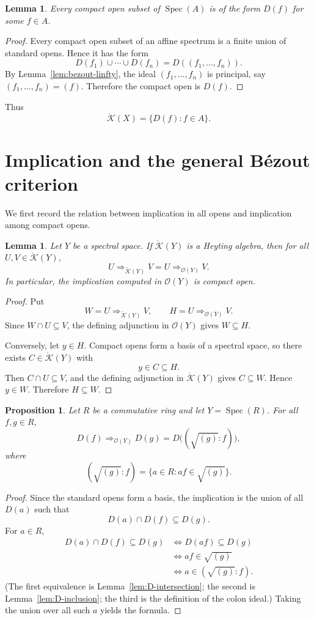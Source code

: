 \documentclass{amsart}
\newtheorem{proposition}[theorem]{Proposition}
\newtheorem{lemma}[theorem]{Lemma}
\theoremstyle{definition}
\theoremstyle{remark}
\newcommand{\Spec}[1]{\operatorname{Spec}\left(#1\right)}
\newcommand{\Op}[1]{\mathcal{O}\left(#1\right)}
\newcommand{\KOp}[1]{\mathring{\mathcal{K}}\left(#1\right)}
\begin{document}
\begin{lemma}\label{lem:compact-opens-principal}
Every compact open subset of $\Spec{A}$ is of the form $D(f)$ for some
$f\in A$.
\end{lemma}

\begin{proof}
Every compact open subset of an affine spectrum is a finite union of standard
opens. Hence it has the form
\[
D(f_1)\cup\cdots\cup D(f_n)=D((f_1,\dots,f_n)).
\]
By Lemma~\ref{lem:bezout-linfty}, the ideal $(f_1,\dots,f_n)$ is principal,
say $(f_1,\dots,f_n)=(f)$. Therefore the compact open is $D(f)$.
\end{proof}

Thus
\[
\KOp{X}=\{D(f):f\in A\}.
\]

\section{Implication and the general B\'ezout criterion}

We first record the relation between implication in all opens and implication
among compact opens.

\begin{lemma}\label{lem:implications-coincide}
Let $Y$ be a spectral space. If $\KOp{Y}$ is a Heyting algebra, then for all
$U,V\in\KOp{Y}$,
\[
U\Rightarrow_{\KOp{Y}}V
=
U\Rightarrow_{\Op{Y}}V.
\]
In particular, the implication computed in $\Op{Y}$ is compact open.
\end{lemma}

\begin{proof}
Put
\[
W=U\Rightarrow_{\KOp{Y}}V,
\qquad
H=U\Rightarrow_{\Op{Y}}V.
\]
Since $W\cap U\subseteq V$, the defining adjunction in $\Op{Y}$ gives
$W\subseteq H$.

Conversely, let $y\in H$. Compact opens form a basis of a spectral space, so
there exists $C\in\KOp{Y}$ with
\[
y\in C\subseteq H.
\]
Then $C\cap U\subseteq V$, and the defining adjunction in $\KOp{Y}$ gives
$C\subseteq W$. Hence $y\in W$. Therefore $H\subseteq W$.
\end{proof}

\begin{proposition}\label{prop:frame-implication}
Let $R$ be a commutative ring and let $Y=\Spec{R}$. For all $f,g\in R$,
\[
D(f)\Rightarrow_{\Op{Y}}D(g)
=
D\bigl((\sqrt{(g)}:f)\bigr),
\]
where
\[
(\sqrt{(g)}:f)=\{a\in R:af\in\sqrt{(g)}\}.
\]
\end{proposition}

\begin{proof}
Since the standard opens form a basis, the implication is the union of all
$D(a)$ such that
\[
D(a)\cap D(f)\subseteq D(g).
\]
For $a\in R$,
\[
\begin{aligned}
D(a)\cap D(f)\subseteq D(g)
&\iff D(af)\subseteq D(g)\\
&\iff af\in\sqrt{(g)}\\
&\iff a\in(\sqrt{(g)}:f).
\end{aligned}
\]
(The first equivalence is Lemma~\ref{lem:D-intersection}; the second is
Lemma~\ref{lem:D-inclusion}; the third is the definition of the colon
ideal.) Taking the union over all such $a$ yields the formula.
\end{proof}
\end{document}
